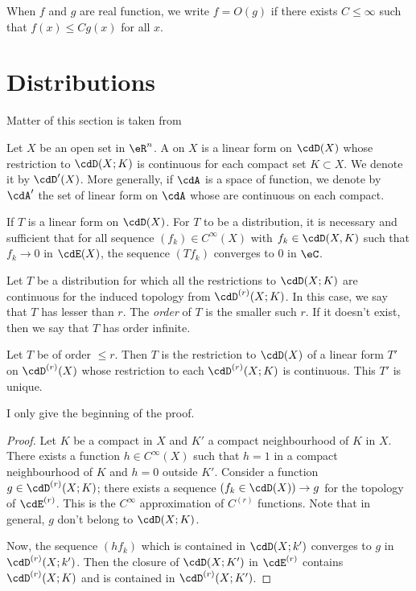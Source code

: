 When $f$ and $g$ are real function, we write $f=O(g)$ if there exists $C\leq\infty$ such that $f(x)\leq Cg(x)$ for all $x$.

\section{Distributions}\label{sec:Distrib}

Matter of this section is taken from \cite{Treves,Dieu3}

Let $X$ be an open set in $\eR^n$. A  on $X$ is a linear form on $\cdD(X)$ whose restriction to $\cdD(X;K)$ is continuous for each compact set $K\subset X$. We denote it by $\cdD'(X)$. More generally, if $\cdA$ is a space of function, we denote by $\cdA'$ the set of linear form on $\cdA$ whose are continuous on each compact.

If $T$ is a linear form on $\cdD(X)$. For $T$ to be a distribution, it is necessary and sufficient that for all sequence $(f_k)\in C^{\infty}(X)$  with $f_k\in\cdD(X,K)$ such that $f_k\to 0$ in $\cdE(X)$, the sequence $(Tf_k)$ converges to $0$ in $\eC$.

Let $T$ be a distribution for which all the restrictions to $\cdD(X;K)$ are continuous for the induced topology from $\cdD^{(r)}(X;K)$. In this case, we say that $T$ has \label{pg:reforder} lesser than $r$. The \emph{order} of $T$ is the smaller such $r$. If it doesn't exist, then we say that $T$ has order infinite.

\begin{proposition}
Let $T$ be of order $\leq r$. Then $T$ is the restriction to $\cdD(X)$ of a linear form $T'$ on $\cdD^{(r)}(X)$ whose restriction to each $\cdD^{(r)}(X;K)$ is continuous. This $T'$ is unique.
\end{proposition}

I only give the beginning of the proof.

\begin{proof}
Let $K$ be a compact in  $X$ and $K'$ a compact neighbourhood of $K$ in $X$. There exists a function $h\in C^{\infty}(X)$ such that $h=1$ in a compact neighbourhood of $K$ and $h=0$ outside $K'$. Consider a function $g\in\cdD^{(r)}(X;K)$; there exists a sequence $(f_k\in\cdD(X))\to g$ for the topology of $\cdE^{(r)}$. This is the $ C^{\infty}$ approximation of $C^{(r)}$ functions. Note that in general, $g$ don't belong to $\cdD(X;K)$.

Now, the sequence $(hf_k)$ which is contained in $\cdD(X;k')$ converges to $g$ in $\cdD^{(r)}(X;k')$. Then the closure of $\cdD(X;K')$ in $\cdE^{(r)}$ contains $\cdD^{(r)}(X;K)$ and is contained in $\cdD^{(r)}(X;K')$.
\end{proof}

